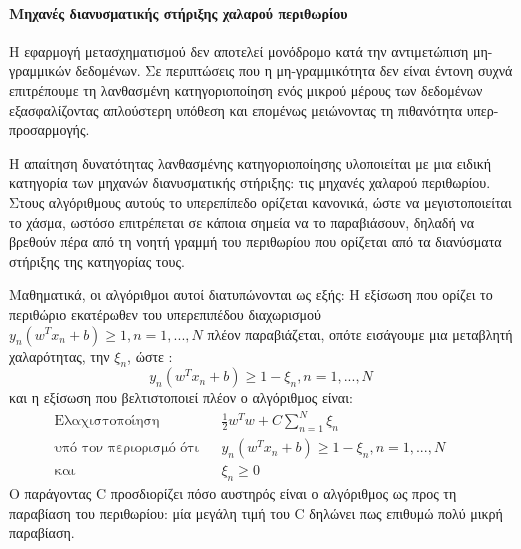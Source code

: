 		\paragraph{Μηχανές διανυσματικής στήριξης χαλαρού περιθωρίου} Η εφαρμογή μετασχηματισμού δεν αποτελεί μονόδρομο κατά την αντιμετώπιση μη-γραμμικών δεδομένων. Σε περιπτώσεις που η μη-γραμμικότητα δεν είναι έντονη συχνά επιτρέπουμε τη λανθασμένη κατηγοριοποίηση ενός μικρού μέρους των δεδομένων εξασφαλίζοντας απλούστερη υπόθεση και επομένως μειώνοντας τη πιθανότητα υπερ-προσαρμογής.
		
		Η απαίτηση δυνατότητας λανθασμένης κατηγοριοποίησης υλοποιείται με μια ειδική κατηγορία των μηχανών διανυσματικής στήριξης: τις μηχανές χαλαρού περιθωρίου. Στους αλγόριθμους αυτούς το υπερεπίπεδο ορίζεται κανονικά, ώστε να μεγιστοποιείται το χάσμα, ωστόσο επιτρέπεται σε κάποια σημεία να το παραβιάσουν, δηλαδή να βρεθούν πέρα από τη νοητή γραμμή του περιθωρίου που ορίζεται από τα διανύσματα στήριξης της κατηγορίας τους.
		
		
		Μαθηματικά, οι αλγόριθμοι αυτοί διατυπώνονται ως εξής: Η εξίσωση που ορίζει το περιθώριο εκατέρωθεν του υπερεπιπέδου διαχωρισμού $y_n (w^T x_n + b) \geq 1, n=1,..., N$ πλέον παραβιάζεται, οπότε εισάγουμε μια μεταβλητή χαλαρότητας, την $\xi_n$, ώστε :
		\begin{equation}
		y_n (w^T x_n + b) \geq 1 - \xi_n, n=1, ..., N
		\end{equation}
		και η εξίσωση που βελτιστοποιεί πλέον ο αλγόριθμος είναι:
		\begin{align}
		\text{Ελαχιστοποίηση} && \frac{1}{2} w^T w + C \sum_{n=1}^{N} \xi_n  &&\\
		\text{υπό τον περιορισμό ότι} &&y_n (w^T x_n + b) \geq 1 - \xi_n, n=1, ..., N  &&\\
		\text{και} && \xi_n \geq 0  &&
		\end{align}
		Ο παράγοντας C προσδιορίζει πόσο αυστηρός είναι ο αλγόριθμος ως προς τη παραβίαση του περιθωρίου: μία μεγάλη τιμή του C δηλώνει πως επιθυμώ πολύ μικρή παραβίαση.